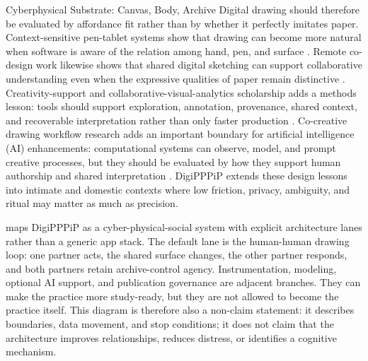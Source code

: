 \documentclass[
  ignorenonframetext,
]{beamer}
\begin{document}
\begin{frame}{Cyberphysical Substrate: Canvas,
Body, Archive}
Digital drawing should therefore be evaluated by affordance fit rather
than by whether it perfectly imitates paper. Context-sensitive
pen-tablet systems show that drawing can become more natural when
software is aware of the relation among hand, pen, and surface
. Remote co-design work likewise shows that
shared digital sketching can support collaborative understanding even
when the expressive qualities of paper remain distinctive
. Creativity-support and
collaborative-visual-analytics scholarship adds a methods lesson: tools
should support exploration, annotation, provenance, shared context, and
recoverable interpretation rather than only faster production
. Co-creative
drawing workflow research adds an important boundary for artificial
intelligence (AI) enhancements: computational systems can observe,
model, and prompt creative processes, but they should be evaluated by
how they support human authorship and shared interpretation
. DigiPPPiP extends these design lessons into
intimate and domestic contexts where low friction, privacy, ambiguity,
and ritual may matter as much as precision.

 maps DigiPPPiP as a cyber-physical-social
system with explicit architecture lanes rather than a generic app stack.
The default lane is the human-human drawing loop: one partner acts, the
shared surface changes, the other partner responds, and both partners
retain archive-control agency. Instrumentation, modeling, optional AI
support, and publication governance are adjacent branches. They can make
the practice more study-ready, but they are not allowed to become the
practice itself. This diagram is therefore also a non-claim statement:
it describes boundaries, data movement, and stop conditions; it does not
claim that the architecture improves relationships, reduces distress, or
identifies a cognitive mechanism.


\end{frame}
\end{document}

